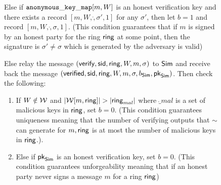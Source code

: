 \begin{figure}
\begin{tcolorbox}[left=2pt,right=2pt]
{\begin{list}{\hspace*{1pt} C}{,\setlength\leftmargin{0.15in}}
				\label{cond:consistency}
				\item Else if $ \mathtt{anonymous\_key\_map}[m,W]  $ is an honest verification key and  there exists a record $ [m, W,\ring, \sigma', 1] $ for any $ \sigma' $, then let $ b=1 $ and record $ [m, W,\ring,\sigma, 1] $. (This condition guarantees that if $ m $ is signed by an honest party for the ring $ \mathsf{ring} $ at some point, then the signature is $ \sigma' \neq \sigma $ which is generated by the adversary is valid) \label{cond:differentsignature}
				
				\item \label{cond:malicioussignature}Else relay the message $(\mathsf{verify}, \textsf{sid}, \mathsf{ring},W, m, \sigma)$ to $ \mathsf{Sim} $ and receive back the message $(\mathsf{verified}, \textsf{sid}, \mathsf{ring},W, m, \sigma, b_{\mathsf{Sim}}, \mathsf{pk}_{\mathsf{Sim}})$.  Then check the following:

				\begin{enumerate}
					\item If $ W \notin \mathcal{W} $ and $ |\mathcal{W}[m, \mathsf{ring}]| > |\mathsf{ring}_{mal}| $ where $ \ring_{mal} $ is a set of malicious keys in $ \mathsf{ring} $, set $ b = 0 $.
					(This condition guarantees  uniqueness meaning that the number of verifying outputs that $ \sim $ can generate for $ m, \mathsf{ring} $ is at most the  number of malicious keys in $ \mathsf{ring} $.)\label{cond:uniqueness}.
					
					\item Else if $ \mathsf{pk}_{\mathsf{Sim}} $ is an honest verification key, set $ b = 0 $. (This condition guarantees unforgeability meaning that if an honest party never signs a message $ m $ for a ring $ \mathsf{ring} $)\label{cond:forgery}
					

\end{enumerate}
\end{list}}
\end{tcolorbox}
\end{figure}

